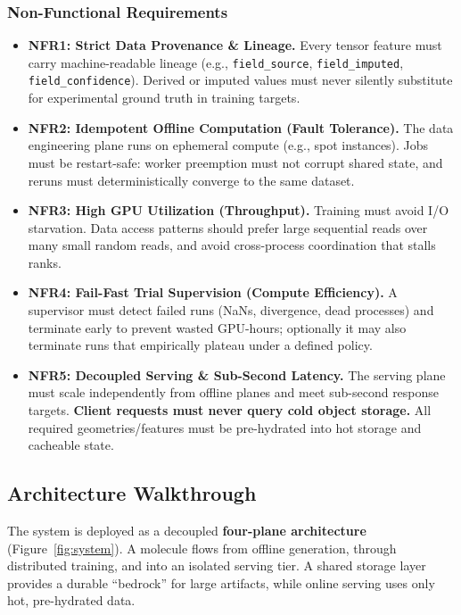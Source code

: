\documentclass[10pt]{article}
\begin{document}
\subsubsection*{Non-Functional Requirements}
\begin{itemize}
\item \textbf{NFR1: Strict Data Provenance \& Lineage.} Every tensor feature must carry machine-readable lineage (e.g., \texttt{field\_source}, \texttt{field\_imputed}, \texttt{field\_confidence}). Derived or imputed values must never silently substitute for experimental ground truth in training targets.

\item[] \textbf{NFR2: Idempotent Offline Computation (Fault Tolerance).} The data engineering plane runs on ephemeral compute (e.g., spot instances). Jobs must be restart-safe: worker preemption must not corrupt shared state, and reruns must deterministically converge to the same dataset.

\item[] \textbf{NFR3: High GPU Utilization (Throughput).} Training must avoid I/O starvation. Data access patterns should prefer large sequential reads over many small random reads, and avoid cross-process coordination that stalls ranks.

\item[] \textbf{NFR4: Fail-Fast Trial Supervision (Compute Efficiency).} A supervisor must detect failed runs (NaNs, divergence, dead processes) and terminate early to prevent wasted GPU-hours; optionally it may also terminate runs that empirically plateau under a defined policy.

\item \textbf{NFR5: Decoupled Serving \& Sub-Second Latency.} The serving plane must scale independently from offline planes and meet sub-second response targets. \textbf{Client requests must never query cold object storage.} All required geometries/features must be pre-hydrated into hot storage and cacheable state.

\end{itemize}

\subsection{Architecture Walkthrough}
\label{subsection:arch-walkthrough}

The system is deployed as a decoupled \textbf{four-plane architecture} (Figure~\ref{fig:system}). A molecule flows from offline generation, through distributed training, and into an isolated serving tier. A shared storage layer provides a durable ``bedrock'' for large artifacts, while online serving uses only hot, pre-hydrated data.
\end{document}
